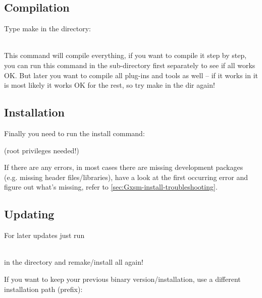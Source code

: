 \subsection{Compilation}
Type make in the  directory:

\\[1mm]
This command will compile everything, if you want to compile it step by step,
you can run this command in the  sub-directory first separately to
see if all works OK. But later you want to compile all plug-ins and tools as
well -- if it works in  it is most likely it works OK for the
rest, so try make in the  dir again!


\subsection{Installation}
Finally you need to run the install command:

 \hfill (root privileges needed!)

If there are any errors, in most cases there are missing development packages
(e.g. missing header files/libraries), have a look at the first occurring error
and figure out what's missing, refer to \ref{sec:Gxsm-install-troubleshooting}.


\subsection{Updating}

For later updates just run

\\[1mm]
in the  directory and remake/install all again!

If you want to keep your previous binary version/installation, use a different
installation path (prefix):

